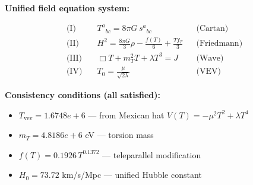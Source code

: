 
\textbf{Unified field equation system:}

\begin{align}
  \text{(I)} \quad & T^a{}_{bc} = 8\pi G \, s^a{}_{bc} && \text{(Cartan)} \\
  \text{(II)} \quad & H^2 = \frac{8\pi G}{3}\rho - \frac{f(T)}{6} + \frac{Tf_T}{3} && \text{(Friedmann)} \\
  \text{(III)} \quad & \Box T + m_T^2 T + \lambda T^3 = J && \text{(Wave)} \\
  \text{(IV)} \quad & T_0 = \frac{\mu}{\sqrt{2\lambda}} && \text{(VEV)}
\end{align}

\textbf{Consistency conditions (all satisfied):}
\begin{itemize}
  \item $T_{\text{vev}} = 1.6748e+6$ — from Mexican hat $V(T) = -\mu^2 T^2 + \lambda T^4$
  \item $m_T = 4.8186e+6$ eV — torsion mass
  \item $f(T) = 0.1926 \, T^{0.1372}$ — teleparallel modification
  \item $H_0 = 73.72$ km/s/Mpc — unified Hubble constant
\end{itemize}